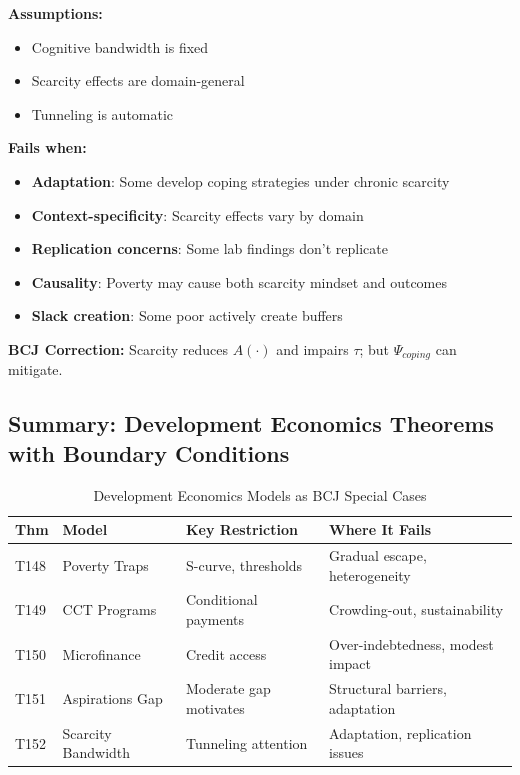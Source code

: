 \begin{tcolorbox}[colback=red!5!white, colframe=red!75!black, title=Boundary Condition: Where Scarcity Model Fails]
\textbf{Assumptions:}
\begin{itemize}[nosep]
\item Cognitive bandwidth is fixed
\item Scarcity effects are domain-general
\item Tunneling is automatic
\end{itemize}

\textbf{Fails when:}
\begin{itemize}[nosep]
\item \textbf{Adaptation}: Some develop coping strategies under chronic scarcity
\item \textbf{Context-specificity}: Scarcity effects vary by domain
\item \textbf{Replication concerns}: Some lab findings don't replicate
\item \textbf{Causality}: Poverty may cause both scarcity mindset and outcomes
\item \textbf{Slack creation}: Some poor actively create buffers
\end{itemize}

\textbf{BCJ Correction:} Scarcity reduces $A(\cdot)$ and impairs $\tau$; but $\Psi_{coping}$ can mitigate.
\end{tcolorbox}

\subsection{Summary: Development Economics Theorems with Boundary Conditions}

\begin{table}[htbp]
\centering
\caption{Development Economics Models as BCJ Special Cases}
\label{tab:dev-econ-boundaries}
\renewcommand{\arraystretch}{1.2}
\begin{tabular}{@{}llp{3.5cm}p{4cm}@{}}
\toprule
\textbf{Thm} & \textbf{Model} & \textbf{Key Restriction} & \textbf{Where It Fails} \\
\midrule
T148 & Poverty Traps & S-curve, thresholds & Gradual escape, heterogeneity \\
T149 & CCT Programs & Conditional payments & Crowding-out, sustainability \\
T150 & Microfinance & Credit access & Over-indebtedness, modest impact \\
T151 & Aspirations Gap & Moderate gap motivates & Structural barriers, adaptation \\
T152 & Scarcity Bandwidth & Tunneling attention & Adaptation, replication issues \\
\bottomrule
\end{tabular}
\end{table}

